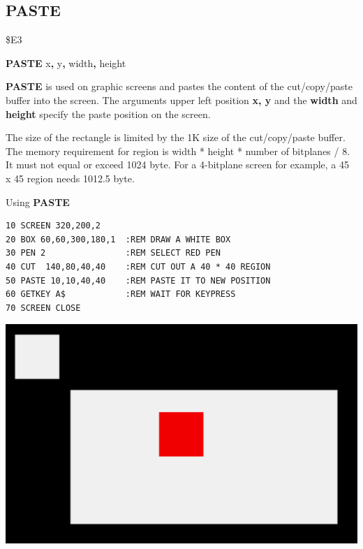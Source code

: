 
\newpage
\subsection{PASTE}
\begin{description}[leftmargin=2cm,style=nextline]
\item [Token:] \$E3
\item [Format:] {\bf PASTE} x{\bf,} y{\bf,} width{\bf,} height
\item [Usage:] {\bf PASTE} is used on graphic screens and pastes the content
               of the cut/copy/paste buffer into the screen.
               The arguments upper left position {\bf x, y} and the {\bf width}
               and {\bf height} specify the paste position on the screen.

\item [Remarks:] The size of the rectangle is limited by the 1K size of
                 the cut/copy/paste buffer. The memory requirement for
                 region is width * height * number of bitplanes / 8.
                 It must not equal or exceed 1024 byte.
                 For a 4-bitplane screen for example, a 45 x 45 region
                 needs 1012.5 byte.

\item [Example:] Using {\bf PASTE}
\begin{tcolorbox}[colback=black,coltext=white]
\verbatimfont{\codefont}
\begin{verbatim}
10 SCREEN 320,200,2
20 BOX 60,60,300,180,1  :REM DRAW A WHITE BOX
30 PEN 2                :REM SELECT RED PEN
40 CUT  140,80,40,40    :REM CUT OUT A 40 * 40 REGION
50 PASTE 10,10,40,40    :REM PASTE IT TO NEW POSITION
60 GETKEY A$            :REM WAIT FOR KEYPRESS
70 SCREEN CLOSE
\end{verbatim}
\end{tcolorbox}
\item \begin{center}\includegraphics[width=0.7\linewidth]{images/cut.png}\end{center}
\end{description}

